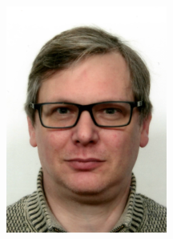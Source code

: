\documentclass[a4paper,10pt]{article}
\begin{document}
\begin{adjustbox}{}
\begin{minipage}[c]{0.3\textwidth}
      \includegraphics[width=\textwidth]{assets/sascha-rose.png}
    \end{minipage}
  \end{adjustbox}

  \vspace{1.5em}
\end{document}
